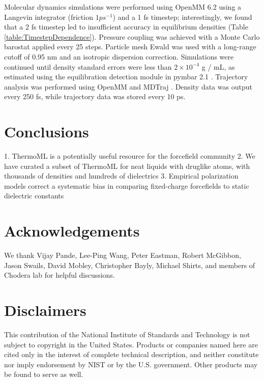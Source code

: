 \documentclass[journal=jacsat,manuscript=article]{achemso}
\begin{document}
Molecular dynamics simulations were performed using OpenMM 6.2 using a Langevin integrator (friction $1 ps^{-1}$) and a 1 fs timestep; interestingly, we found that a 2 fs timestep led to insufficient accuracy in equilibrium densities (Table \ref{table:TimestepDependence}).  Pressure coupling was achieved with a Monte Carlo barostat applied every 25 steps.  Particle mesh Ewald \cite{Darden1993} was used with a long-range cutoff of 0.95 nm and an isotropic dispersion correction.  Simulations were continued until density standard errors were less than $2 \times 10^{-4}$ g / mL, as estimated using the equilibration detection module in pymbar 2.1 \cite{shirts2008statistically}.  Trajectory analysis was performed using OpenMM \cite{eastman2012openmm} and MDTraj \cite{mcgibbon2014mdtraj}.  Density data was output every 250 fs, while trajectory data was stored every 10 ps.  

\section{Conclusions}

1.  ThermoML is a potentially useful resource for the forcefield community
2.  We have curated a subset of ThermoML for neat liquids with druglike atoms, with thousands of densities and hundreds of dielectrics
3.  Empirical polarization models correct a systematic bias in comparing fixed-charge forcefields to static dielectric constants


\section{Acknowledgements}

We thank Vijay Pande, Lee-Ping Wang, Peter Eastman, Robert McGibbon, Jason Swails, David Mobley, Christopher Bayly, Michael Shirts, and members of Chodera lab for helpful discussions.  

\section{Disclaimers}

This contribution of the National Institute of Standards and Technology is not subject to copyright in the United States.  Products or companies named here are cited only in the interest of complete technical description, and neither constitute nor imply endorsement by NIST or by the U.S. government.  Other products may be found to serve as well.

\clearpage
\end{document}
